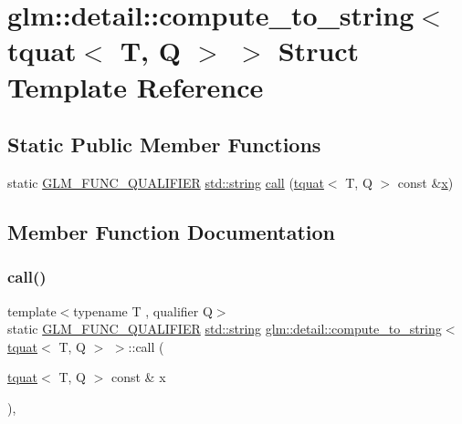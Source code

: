 \hypertarget{structglm_1_1detail_1_1compute__to__string_3_01tquat_3_01_t_00_01_q_01_4_01_4}{}\section{glm\+:\+:detail\+:\+:compute\+\_\+to\+\_\+string$<$ tquat$<$ T, Q $>$ $>$ Struct Template Reference}
\label{structglm_1_1detail_1_1compute__to__string_3_01tquat_3_01_t_00_01_q_01_4_01_4}
\subsection*{Static Public Member Functions}
\begin{DoxyCompactItemize}
\item 
static \hyperlink{setup_8hpp_a33fdea6f91c5f834105f7415e2a64407}{G\+L\+M\+\_\+\+F\+U\+N\+C\+\_\+\+Q\+U\+A\+L\+I\+F\+I\+ER} \hyperlink{_s_d_l__opengl__glext_8h_ae84541b4f3d8e1ea24ec0f466a8c568b}{std\+::string} \hyperlink{structglm_1_1detail_1_1compute__to__string_3_01tquat_3_01_t_00_01_q_01_4_01_4_a1ba65d187491ea559fde0e390800326a}{call} (\hyperlink{structglm_1_1tquat}{tquat}$<$ T, Q $>$ const \&\hyperlink{_s_d_l__opengl_8h_ad0e63d0edcdbd3d79554076bf309fd47}{x})
\end{DoxyCompactItemize}


\subsection{Member Function Documentation}
\mbox{\label{structglm_1_1detail_1_1compute__to__string_3_01tquat_3_01_t_00_01_q_01_4_01_4_a1ba65d187491ea559fde0e390800326a}} 
\subsubsection{\texorpdfstring{call()}{call()}}
{\footnotesize\ttfamily template$<$typename T , qualifier Q$>$ \\
static \hyperlink{setup_8hpp_a33fdea6f91c5f834105f7415e2a64407}{G\+L\+M\+\_\+\+F\+U\+N\+C\+\_\+\+Q\+U\+A\+L\+I\+F\+I\+ER} \hyperlink{_s_d_l__opengl__glext_8h_ae84541b4f3d8e1ea24ec0f466a8c568b}{std\+::string} \hyperlink{structglm_1_1detail_1_1compute__to__string}{glm\+::detail\+::compute\+\_\+to\+\_\+string}$<$ \hyperlink{structglm_1_1tquat}{tquat}$<$ T, Q $>$ $>$\+::call (\begin{DoxyParamCaption}\item[{\hyperlink{structglm_1_1tquat}{tquat}$<$ T, Q $>$ const \&}]{x }\end{DoxyParamCaption})\hspace{0.3cm}{\ttfamily [inline]}, {\ttfamily [static]}}



